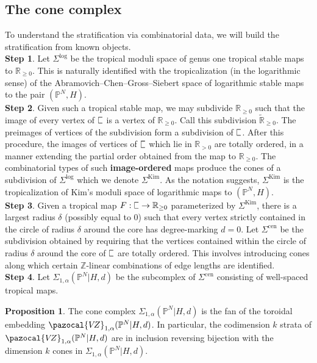 \documentclass[11pt]{amsart}
\newcommand{\plC}{\scalebox{0.8}[1.3]{$\sqsubset$}}
\newcommand{\Kim}{\operatorname{Kim}}
\newcommand{\PP}{\mathbb P}
\newcommand{\Z}{\mathbb{Z}}
\newcommand{\VZ}{\pazocal{V\!Z}}
\renewcommand{\to}{\rightarrow}
\newcommand{\RR}{\mathbb{R}}
\theoremstyle{definition}
\newtheorem{prop}[thm]{Proposition}
\theoremstyle{definition}
\begin{document}
\subsection{The cone complex} To understand the stratification via combinatorial data, we will build the stratification from known objects. \\

\noindent
\textbf{Step 1}. Let $\Sigma^{\mathrm{log}}$ be the tropical moduli space of genus one tropical stable maps to $\mathbb R_{\geq 0}$. This is naturally identified with the tropicalization (in the logarithmic sense) of the Abramovich--Chen--Gross--Siebert space of logarithmic stable maps to the pair $(\mathbb P^N,H)$. \\

\noindent
\textbf{Step 2}. Given such a tropical stable map, we may subdivide $\mathbb R_{\geq 0}$ such that the image of every vertex of $\plC$ is a vertex of $\mathbb R_{\geq 0}$. Call this subdivision $\widetilde{\mathbb R}_{\geq 0}$. The preimages of vertices of the subdivision form a subdivision of $\plC$. After this procedure, the images of vertices of $\plC$ which lie in $\RR_{>0}$ are totally ordered, in a manner extending the partial order obtained from the map to $\mathbb R_{\geq 0}$. The combinatorial types of such \textbf{image-ordered} maps produce the cones of a subdivision of $\Sigma^{\mathrm{log}}$ which we denote $\Sigma^{\mathrm{Kim}}$. As the notation suggests, $\Sigma^{\Kim}$ is the tropicalization of Kim's moduli space of logarithmic maps to $(\PP^N,H)$.\\

\noindent
\textbf{Step 3}. Given a tropical map $F: \plC\to \mathbb R_{\geq 0}$ parameterized by $\Sigma^{\mathrm{Kim}}$, there is a largest radius $\delta$ (possibly equal to $0$) such that every vertex strictly contained in the circle of radius $\delta$ around the core has degree-marking $d=0$. Let $
\Sigma^{\mathrm{cen}}$ be the subdivision obtained by requiring that the vertices contained within the circle of radius $\delta$ around the core of $\plC$ are totally ordered. This involves introducing cones along which certain $\Z$-linear combinations of edge lengths are identified.\\

\noindent
\textbf{Step 4}. Let $\Sigma_{1,\alpha}(\mathbb P^N|H,d)$ be the subcomplex of $\Sigma^{\mathrm{cen}}$ consisting of well-spaced tropical maps.

\begin{prop}
The cone complex $
\Sigma_{1,\alpha}(\mathbb P^N|H,d)$ is the fan of the toroidal embedding $
\VZ_{1,\alpha}(\mathbb P^N|H,d)$. In particular, the codimension $k$ strata of $
\VZ_{1,\alpha}(\mathbb P^N|H,d)$ are in inclusion reversing bijection with the dimension $k$ cones in $
\Sigma_{1,\alpha}(\mathbb P^N|H,d)$.
\end{prop}
\end{document}
